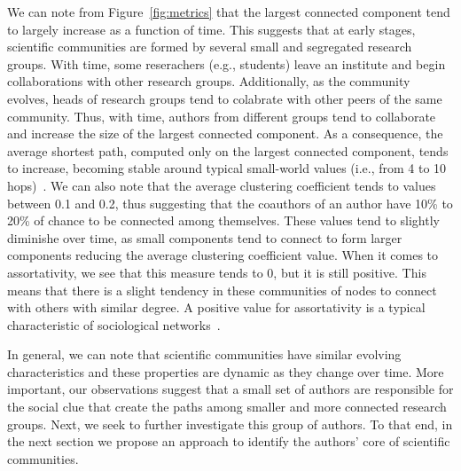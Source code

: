 We can note from Figure~\ref{fig:metrics} that the largest connected component tend to largely increase as a function of time. This suggests that at early
stages, scientific communities are formed by several small and segregated research groups. With time, some reserachers (e.g., students) leave an institute and begin collaborations
with other research groups. Additionally, as the community evolves, heads of  research groups tend to colabrate with other peers of the same community. Thus, with time, authors
from different groups tend to collaborate and increase the size of the largest connected component. As a consequence, the average shortest path, computed only on the largest
connected component, tends to increase, becoming stable around typical small-world values (i.e., from 4 to 10 hops)~\cite{mislove-2007-socialnetworks,fourdegrees_facebook}.  We can
also note that the average clustering coefficient tends to values between 0.1 and 0.2, thus suggesting that the coauthors of an author have 10\% to 20\% of chance to be connected
among themselves. These values tend to slightly diminishe over time, as small components tend to connect to form larger components reducing the average clustering coefficient
value.  When it comes to assortativity, we see that this measure tends to 0, but it is still positive. This means that there is a slight tendency in these communities of nodes to
connect with others with similar degree.  A positive value for assortativity is a typical characteristic of sociological networks~\cite{Newman2003}.

In general, we can note that scientific communities have similar evolving characteristics and these properties are dynamic as they change over time.  More important, our
observations suggest that a small set of authors are responsible for the social clue that create the paths among smaller and more connected research groups. Next, we seek to
further investigate this group of authors. To that end, in the next section we propose an approach to identify the authors' core of scientific communities.




